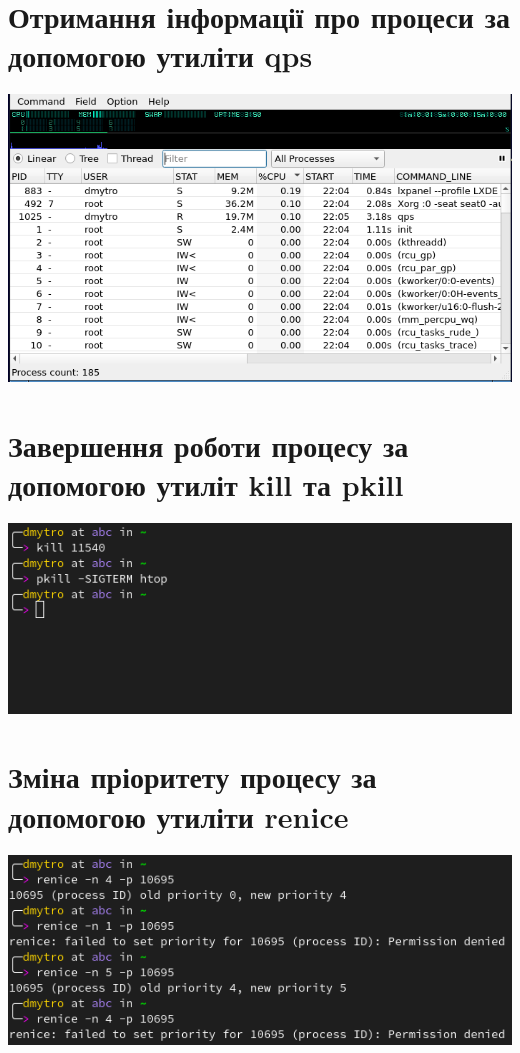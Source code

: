\documentclass{article}
\begin{document}
\begin{normalsize}
	\section*{Отримання інформації про процеси за допомогою утиліти qps}
	\begin{center}
		\includegraphics[scale=0.5]{qps1}
	\end{center}
	\section*{Завершення роботи процесу за допомогою утиліт kill та pkill}
	\begin{center}
		\includegraphics[scale=0.5]{kill}
	\end{center}
	\section*{Зміна пріоритету процесу за допомогою утиліти renice}
	\begin{center}
		\includegraphics[scale=0.5]{renice}
	\end{center}

\end{normalsize}
\end{document}
